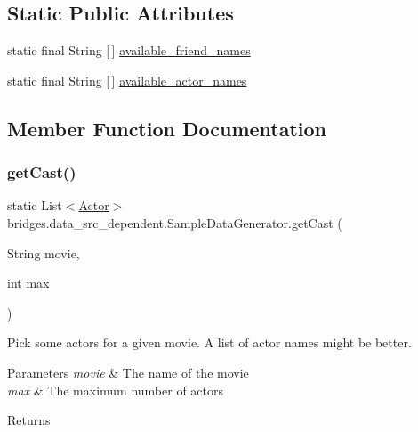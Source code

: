 \subsection*{Static Public Attributes}
\begin{DoxyCompactItemize}
\item 
static final String \mbox{[}$\,$\mbox{]} \mbox{\hyperlink{classbridges_1_1data__src__dependent_1_1_sample_data_generator_a304c946018534a5a2b0049aace9d4472}{available\+\_\+friend\+\_\+names}}
\item 
static final String \mbox{[}$\,$\mbox{]} \mbox{\hyperlink{classbridges_1_1data__src__dependent_1_1_sample_data_generator_aac86cadaeb8859e94b6ed47a066cbbfc}{available\+\_\+actor\+\_\+names}}
\end{DoxyCompactItemize}


\subsection{Member Function Documentation}
\mbox{\label{classbridges_1_1data__src__dependent_1_1_sample_data_generator_a2e5c2ea6214a140a50b375f4e859ed0d}} 
\subsubsection{\texorpdfstring{getCast()}{getCast()}}
{\footnotesize\ttfamily static List$<$\mbox{\hyperlink{classbridges_1_1data__src__dependent_1_1_actor}{Actor}}$>$ bridges.\+data\+\_\+src\+\_\+dependent.\+Sample\+Data\+Generator.\+get\+Cast (\begin{DoxyParamCaption}\item[{String}]{movie,  }\item[{int}]{max }\end{DoxyParamCaption})\hspace{0.3cm}{\ttfamily [static]}}

Pick some actors for a given movie. A list of actor names might be better.


\begin{DoxyParams}{Parameters}
{\em movie} & The name of the movie \\
\hline
{\em max} & The maximum number of actors \\
\hline
\end{DoxyParams}
\begin{DoxyReturn}{Returns}

\end{DoxyReturn}
\mbox{\label{classbridges_1_1data__src__dependent_1_1_sample_data_generator_a5b93af083c764f1046ebb6d1b9ae8d6f}} 
